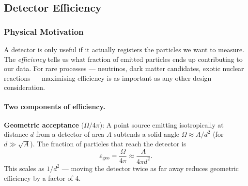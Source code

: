
\subsection{Detector Efficiency}
\label{subsec:lec07:efficiency}

\subsubsection*{Physical Motivation}
A detector is only useful if it actually registers the particles we want to
measure.  The \emph{efficiency} tells us what fraction of emitted particles
ends up contributing to our data.  For rare processes — neutrinos, dark matter
candidates, exotic nuclear reactions — maximising efficiency is as important as
any other design consideration.


\paragraph{Two components of efficiency.}

\textbf{Geometric acceptance} ($\Omega/4\pi$): A point source emitting
isotropically at distance $d$ from a detector of area $A$ subtends a solid
angle $\Omega \approx A/d^2$ (for $d \gg \sqrt{A}$).  The fraction of particles
that reach the detector is
\begin{equation}
  \label{eq:lec07:geo_eff}
  \varepsilon_\text{geo} = \frac{\Omega}{4\pi} \approx \frac{A}{4\pi d^2}.
\end{equation}
This scales as $1/d^2$ — moving the detector twice as far away reduces geometric
efficiency by a factor of 4.

